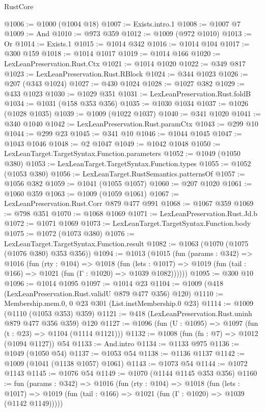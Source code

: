 \begin{lexlean}{RustCore}
\begin{coremodule}
@1006 := @1000 (@1004 @18)
@1007 := Exists.intro.{1}
@1008 := @1007 @7
@1009 := And
@1010 := @973 @359
@1012 := @1009 (@972 @1010)
@1013 := Or
@1014 := Exists.{1}
@1015 := @1014 @342
@1016 := @1014 @104
@1017 := @300 @159
@1018 := @1014 @1017
@1019 := @1014 @166
@1020 := LexLeanPreservation.Rust.Ctx
@1021 := @1014 @1020
@1022 := @349 @817
@1023 := LexLeanPreservation.Rust.RBlock
@1024 := @344 @1023
@1026 := @207 (@343 @1024)
@1027 := @430 @1024
@1028 := @1027 @382
@1029 := @433 @1023
@1030 := @1029 @351
@1031 := LexLeanPreservation.Rust.foldB
@1034 := @1031 (@158 @353 @356)
@1035 := @1030 @1034
@1037 := @1026 (@1028 @1035)
@1039 := @1009 (@1022 @1037)
@1040 := @341 @1020
@1041 := @340 @1040
@1042 := LexLeanPreservation.Rust.paramCtx
@1043 := @299 @10
@1044 := @299 @23
@1045 := @341 @10
@1046 := @1044 @1045
@1047 := @1043 @1046
@1048 := @2 @1047
@1049 := @1042 @1048
@1050 := LexLeanTarget.TargetSyntax.Function.parameters
@1052 := @1049 (@1050 @380)
@1053 := LexLeanTarget.TargetSyntax.Function.types
@1055 := @1052 (@1053 @380)
@1056 := LexLeanTarget.RustSemantics.patternsOf
@1057 := @1056 @382
@1059 := @1041 (@1055 @1057)
@1060 := @207 @1020
@1061 := @1060 @359
@1063 := @1009 (@1059 @1061)
@1067 := LexLeanPreservation.Rust.Corr @879 @477 @991
@1068 := @1067 @359
@1069 := @798 @351
@1070 := @1068 @1069
@1071 := LexLeanPreservation.Rust.Jd.b
@1072 := @1071 @1069
@1073 := LexLeanTarget.TargetSyntax.Function.body
@1075 := @1072 (@1073 @380)
@1076 := LexLeanTarget.TargetSyntax.Function.result
@1082 := @1063 (@1070 (@1075 (@1076 @380) @353 @356))
@1094 := @1013
    (@1015
      (fun (params : @342) =>
      @1016
        (fun (rty : @104) =>
        @1018
          (fun (lets : @1017) =>
          @1019 (fun (tail : @166) => @1021 (fun (Γ : @1020) => @1039 @1082))))))
@1095 := @300 @10
@1096 := @1014 @1095
@1097 := @1014 @23
@1104 := @1009 (@418 (LexLeanPreservation.Rust.validU @879 @477 @356) @120)
@1110 := Membership.mem.{0, 0} @23 @301 (List.instMembership.{0} @23)
@1114 := @1009 (@1110 (@1053 @353) @359)
@1121 := @418 (LexLeanPreservation.Rust.uninh @879 @477 @356 @359) @120
@1127 := @1096 (fun (U : @1095) => @1097 (fun (t : @23) => @1104 (@1114 @1121)))
@1132 := @1008 (fun (fn : @7) => @1012 (@1094 @1127)) @54
@1133 := And.intro
@1134 := @1133 @975
@1136 := @1049 (@1050 @54)
@1137 := @1053 @54
@1138 := @1136 @1137
@1142 := @1009 (@1041 (@1138 @1057) @1061)
@1143 := @1073 @54
@1144 := @1072 @1143
@1145 := @1076 @54
@1149 := @1070 (@1144 @1145 @353 @356)
@1160 := fun (params : @342) =>
  @1016
    (fun (rty : @104) =>
    @1018
      (fun (lets : @1017) =>
      @1019 (fun (tail : @166) => @1021 (fun (Γ : @1020) => @1039 (@1142 @1149)))))

\end{coremodule}
\end{lexlean}
